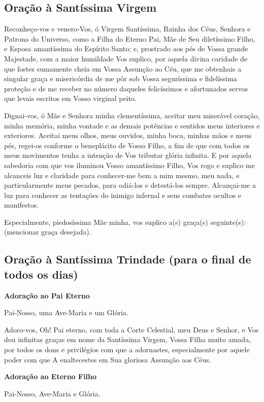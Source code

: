 \documentclass[18pt]{article}
\begin{document}
\subsection*{Oração à Santíssima Virgem}
Reconheço-vos e venero-Vos, ó Virgem Santíssima, Rainha dos Céus, Senhora e Patrona do Universo, como a Filha do Eterno Pai, Mãe de Seu diletíssimo Filho, e Esposa amantíssima do Espírito Santo; e, prostrado aos pés de Vossa grande Majestade, com a maior humildade Vos suplico, por aquela divina caridade de que fostes sumamente cheia em Vossa Assunção ao Céu, que me obtenhais a singular graça e misericórdia de me pôr sob Vossa seguríssima e fidelíssima proteção e de me receber no número daqueles felicíssimos e afortunados servos que levais escritos em Vosso virginal peito.

Dignai-vos, ó Mãe e Senhora minha clementíssima, aceitar meu miserável coração, minha memória, minha vontade e as demais potências e sentidos meus interiores e exteriores. Aceitai meus olhos, meus ouvidos, minha boca, minhas mãos e meus pés, regei-os conforme o beneplácito de Vosso Filho, a fim de que com todos os meus movimentos tenha a intenção de Vos tributar glória infinita. E por aquela sabedoria com que vos iluminou Vosso amantíssimo Filho, Vos rogo e suplico me alcanceis luz e claridade para conhecer-me bem a mim mesmo, meu nada, e particularmente meus pecados, para odiá-los e detestá-los sempre. Alcançai-me a luz para conhecer as tentações do inimigo infernal e seus combates ocultos e manifestos.

Especialmente, piedosíssima Mãe minha, vos suplico a(s) graça(s) seguinte(s): (mencionar graça desejada).

\subsection*{Oração à Santíssima Trindade (para o final de todos os dias)}

\textbf{Adoração ao Pai Eterno}

Pai-Nosso, uma Ave-Maria e um Glória.

Adoro-vos, Oh! Pai eterno, com toda a Corte Celestial, meu Deus e Senhor, e Vos dou infinitas graças em nome da Santíssima Virgem, Vossa Filha muito amada, por todos os dons e privilégios com que a adornastes, especialmente por aquele poder com que A enaltecestes em Sua gloriosa Assunção aos Céus.

\textbf{Adoração ao Eterno Filho}

Pai-Nosso, Ave-Maria e Glória.
\end{document}
